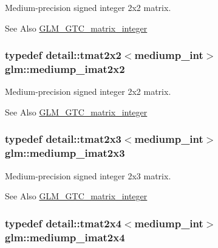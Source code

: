 Medium-\/precision signed integer 2x2 matrix. 

\begin{DoxySeeAlso}{See Also}
\hyperlink{group__gtc__matrix__integer}{G\-L\-M\-\_\-\-G\-T\-C\-\_\-matrix\-\_\-integer} 
\end{DoxySeeAlso}
\hypertarget{group__gtc__matrix__integer_gaf330f41983ed0d499d18277a44a54720}{
\subsubsection[{mediump\-\_\-imat2x2}]{\setlength{\rightskip}{0pt plus 5cm}typedef detail\-::tmat2x2$<$mediump\-\_\-int$>$ {\bf glm\-::mediump\-\_\-imat2x2}}}\label{group__gtc__matrix__integer_gaf330f41983ed0d499d18277a44a54720}


Medium-\/precision signed integer 2x2 matrix. 

\begin{DoxySeeAlso}{See Also}
\hyperlink{group__gtc__matrix__integer}{G\-L\-M\-\_\-\-G\-T\-C\-\_\-matrix\-\_\-integer} 
\end{DoxySeeAlso}
\hypertarget{group__gtc__matrix__integer_gaafb4b3293de5875ece1181709eddaa13}{
\subsubsection[{mediump\-\_\-imat2x3}]{\setlength{\rightskip}{0pt plus 5cm}typedef detail\-::tmat2x3$<$mediump\-\_\-int$>$ {\bf glm\-::mediump\-\_\-imat2x3}}}\label{group__gtc__matrix__integer_gaafb4b3293de5875ece1181709eddaa13}


Medium-\/precision signed integer 2x3 matrix. 

\begin{DoxySeeAlso}{See Also}
\hyperlink{group__gtc__matrix__integer}{G\-L\-M\-\_\-\-G\-T\-C\-\_\-matrix\-\_\-integer} 
\end{DoxySeeAlso}
\hypertarget{group__gtc__matrix__integer_gaebbf06f493d6299238987c9715dc9064}{
\subsubsection[{mediump\-\_\-imat2x4}]{\setlength{\rightskip}{0pt plus 5cm}typedef detail\-::tmat2x4$<$mediump\-\_\-int$>$ {\bf glm\-::mediump\-\_\-imat2x4}}}\label{group__gtc__matrix__integer_gaebbf06f493d6299238987c9715dc9064}


